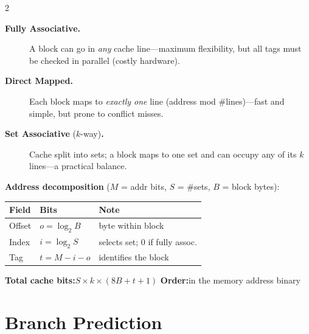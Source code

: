 \documentclass[9pt]{article}
\begin{document}
\begin{multicols}{2}

\begin{description}
  \item[\textbf{Fully Associative.}] A block can go in \emph{any} cache line---maximum flexibility, but all tags must be checked in parallel (costly hardware).
  \item[\textbf{Direct Mapped.}] Each block maps to \emph{exactly one} line (address mod \#lines)---fast and simple, but prone to conflict misses.
  \item[\textbf{Set Associative} ($k$-way)\textbf{.}] Cache split into sets; a block maps to one set and can occupy any of its $k$ lines---a practical balance.
\end{description}

\columnbreak

\textbf{Address decomposition} ($M$ = addr bits, $S$ = \#sets, $B$ = block bytes):

\vspace{3pt}
\begin{tabular}{@{}lll@{}}
  \toprule
  \textbf{Field} & \textbf{Bits} & \textbf{Note} \\
  \midrule
  Offset & $o = \log_2 B$   & byte within block \\
  Index  & $i = \log_2 S$   & selects set; 0 if fully assoc. \\
  Tag    & $t = M - i - o$  & identifies the block \\
  \bottomrule
\end{tabular}

\vspace{3pt}
\textbf{Total cache bits:}\enspace $S \times k \times (8B + t + 1)$
\textbf{Order:}\enspace [$t$] [$i$] [$o$] in the memory address binary

\end{multicols}

\section{Branch Prediction}
\end{document}
